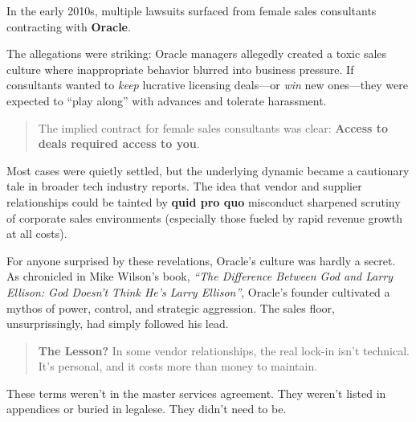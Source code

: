 \begin{tcolorbox}[colback=blue!5!white, colframe=blue!50!black, breakable,
  title={Historical Sidebar: When Dependency Gets Personal --- The Oracle Consultant Allegations}]

In the early 2010s, multiple lawsuits surfaced from female sales consultants contracting with \textbf{Oracle}.  

\medskip

The allegations were striking: Oracle managers allegedly created a toxic sales culture where inappropriate behavior blurred into business pressure.  If consultants wanted to \textit{keep} lucrative licensing deals—or \textit{win} new ones—they were expected to ``play along'' with advances and tolerate harassment.

\medskip

\begin{quote}
The implied contract for female sales consultants was clear: \textbf{Access to deals required access to you}.
\end{quote}

\medskip

Most cases were quietly settled, but the underlying dynamic became a cautionary tale in broader tech industry reports.  The idea that vendor and supplier relationships could be tainted by \textbf{quid pro quo} misconduct sharpened scrutiny of corporate sales environments (especially those fueled by rapid revenue growth at all costs).

\medskip

For anyone surprised by these revelations, Oracle's culture was hardly a secret.  As chronicled in Mike Wilson's book, \textit{``The Difference Between God and Larry Ellison: God Doesn't Think He's Larry Ellison''}, Oracle’s founder cultivated a mythos of power, control, and strategic aggression.  The sales floor, unsurprissingly, had simply followed his lead.

\medskip

\begin{quote}
\textbf{The Lesson?} In some vendor relationships, the real lock-in isn't technical. It's personal, and it costs more than money to maintain.
\end{quote}

\end{tcolorbox}

These terms weren’t in the master services agreement. They weren’t listed in appendices or buried in legalese. They didn’t need to be.


